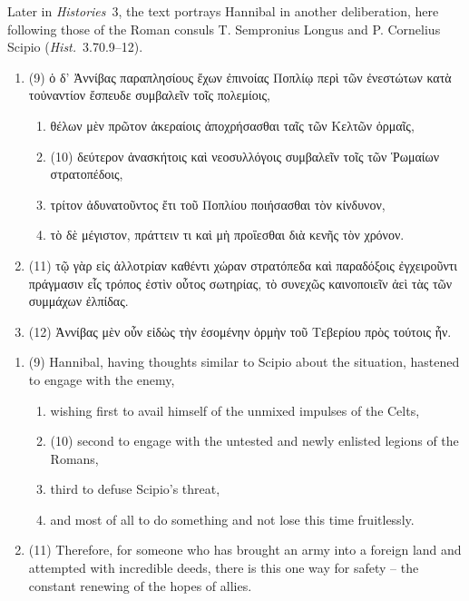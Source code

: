 \documentclass[12pt,letterpaper,oneside,final]{memoir}
\begin{document}
Later in \emph{Histories}~3, the text portrays Hannibal in another deliberation, here following those of the Roman consuls T. Sempronius Longus and P. Cornelius Scipio (\emph{Hist.}~3.70.9--12). \begin{greek} \begin{enumerate} \SingleSpacing \item (9) ὁ δ' Ἀννίβας παραπλησίους ἔχων ἐπινοίας Ποπλίῳ περὶ τῶν ἐνεστώτων κατὰ τοὐναντίον ἔσπευδε συμβαλεῖν τοῖς πολεμίοις, 
  \begin{enumerate} \SingleSpacing 
  \item θέλων μὲν πρῶτον ἀκεραίοις ἀποχρήσασθαι ταῖς τῶν Κελτῶν ὁρμαῖς, 
  \item (10) δεύτερον ἀνασκήτοις καὶ νεοσυλλόγοις συμβαλεῖν τοῖς τῶν Ῥωμαίων στρατοπέδοις, 
  \item τρίτον ἀδυνατοῦντος ἔτι τοῦ Ποπλίου ποιήσασθαι τὸν κίνδυνον, 
  \item τὸ δὲ μέγιστον, πράττειν τι καὶ μὴ προΐεσθαι διὰ κενῆς τὸν χρόνον.
  \end{enumerate}
\item (11) τῷ γὰρ εἰς ἀλλοτρίαν καθέντι χώραν στρατόπεδα καὶ παραδόξοις ἐγχειροῦντι πράγμασιν εἷς τρόπος ἐστὶν οὗτος σωτηρίας, τὸ συνεχῶς καινοποιεῖν ἀεὶ τὰς τῶν συμμάχων ἐλπίδας. 
\item (12) Ἀννίβας μὲν οὖν εἰδὼς τὴν ἐσομένην ὁρμὴν τοῦ Τεβερίου πρὸς τούτοις ἦν.
\end{enumerate} \DoubleSpacing  \end{greek} \begin{enumerate} \SingleSpacing \item (9) Hannibal, having thoughts similar to Scipio about the situation, hastened to engage with the enemy, 
  \begin{enumerate} \SingleSpacing 
  \item wishing first to avail himself of the unmixed impulses of the Celts,
  \item (10) second to engage with the untested and newly enlisted legions of the Romans,
  \item third to defuse Scipio's threat, 
  \item and most of all to do something and not lose this time fruitlessly. 
  \end{enumerate}
\item (11) Therefore, for someone who has brought an army into a foreign land and attempted with incredible deeds, there is this one way for safety -- the constant renewing of the hopes of allies.

\end{enumerate}
\end{document}
